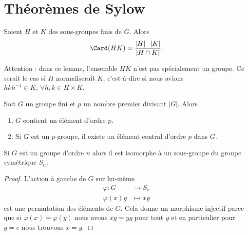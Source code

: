 
\section{Théorèmes de Sylow}

\begin{lemma}
    Soient \( H\) et \( K\) des sous-groupes finis de \( G\). Alors
    \begin{equation}
        \Card(HK)=\frac{ | H |\cdot | K | }{ | H\cap K | }.
    \end{equation}
\end{lemma}
Attention : dans ce lemme, l'ensemble \( HK\) n'est pas spécialement un groupe. Ce serait le cas si \( H\) normaliserait \( K\), c'est-à-dire si nous avions \( hkh^{-1}\in K,\,\forall h,k\in H\times K\).

\begin{theorem}\label{ThoCauchyGpFini}
    Soit \( G\) un groupe fini et \( p\) un nombre premier divisant \( | G |\). Alors
    \begin{enumerate}
        \item
            \( G\) contient un élément d'ordre \( p\).
        \item
            Si \( G\) est un \( p\)-groupe, il existe un élément central d'ordre \( p\) dans \( G\).
    \end{enumerate}
\end{theorem}

\begin{lemma}    \label{ThoIfdlEB}   
    Si \( G\) est un groupe d'ordre \( n\) alors il est isomorphe à un sous-groupe du groupe symétrique \( S_n\).
\end{lemma}

\begin{proof}
    L'action à gauche de \( G\) sur lui-même
    \begin{equation}
        \begin{aligned}
            \varphi\colon G&\to S_n \\
            \varphi(x)g&\mapsto xg
        \end{aligned}
    \end{equation}
    est une permutation des éléments de \( G\). Cela donne un morphisme injectif parce que si \( \varphi(x)=\varphi(y)\) nous avons \( xg=yg\) pour tout \( g\) et en particulier pour \( g=e\) nous trouvons \( x=y\).
\end{proof}

